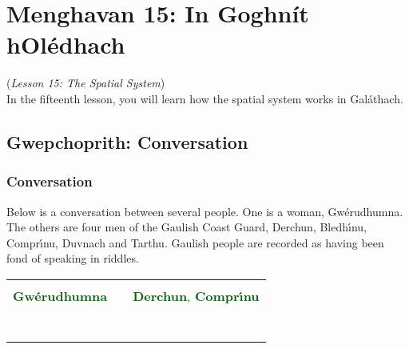 \section{Menghavan 15: In Goghn\'{i}t hOl\'{e}dhach}
(\textit{Lesson 15: The Spatial System})\\

In the fifteenth lesson, you will learn how the spatial system works in Gal\'{a}thach.

\subsection{Gwepchoprith: Conversation}

\subsubsection{Conversation}

Below is a conversation between several people. One is a woman, Gw\'{e}rudhumna. The others are four men of the Gaulish Coast Guard, Derchun, Bledh\'{\i}nu, Compr\'{\i}nu, Duvnach and Tarthu. Gaulish people are recorded as having been fond of speaking in riddles.


\begin{table}[H]
\centering
    \begin{tabular}{cM{10.0cm}c}
     &  & \\
	    \textcolor{darkgreen}{\textbf{Gw\'{e}rudhumna}} &  & \textcolor{darkgreen}{\textbf{Derchun}, \textbf{Compr\'{\i}nu}}\\
     &  & \\
     &  & \\
     &  & \\
     &  & \\
     &  & \\
     &  & \\
     &  & 
    \end{tabular}
\end{table}

